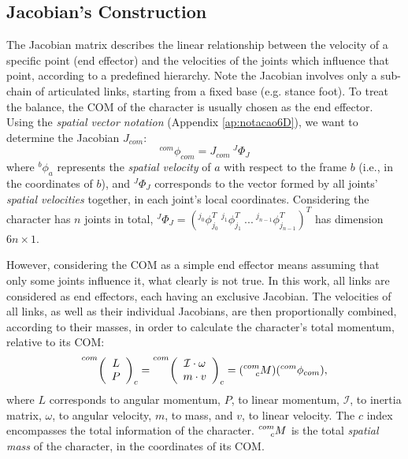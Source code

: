 \documentclass[tog]{acmsiggraph}
\begin{document}
\subsection{Jacobian's Construction}\label{subsec:Jacobiana}

The Jacobian matrix describes the linear relationship between the velocity of a specific point (end effector) and the velocities of the
joints which influence that point, according to a predefined hierarchy. Note the Jacobian involves only a sub-chain of articulated links,
starting from a fixed base (e.g. stance foot). To treat the balance, the COM of the character is usually chosen as the end effector.
Using the \textit{spatial vector notation} (Appendix \ref{ap:notacao6D}), we want to determine the Jacobian $J_ {com}$:
%
\begin{equation}
 ^{com}\phi_{com} = J_{com} ~ ^{J}\Phi_{J}
\label{eq:jacob}
\end{equation}
%
where $^b\phi_a$ represents the \textit{spatial velocity} of $a$ with respect to the frame $b$ (i.e., in the coordinates of $b$), and $^{J}\Phi_{J}$ corresponds to the vector formed by all joints' \textit{spatial velocities} together, in each joint's local coordinates.
Considering the character has $n$ joints in total,
$^{J}\Phi_{J} = \left( ^{j_{0}}\phi_{j_{0}}^T ~ ^{j_{1}}\phi_{j_{1}}^T ~ ... ~ ^{j_{n-1}}\phi_{j_{n-1}}^T \right)^T$ has dimension $6n\times1$.

However, considering the COM as a simple end effector means assuming that only some joints influence it, what clearly is not true.
In this work, all links are considered as end effectors, each having an exclusive Jacobian.
The velocities of all links, as well as their individual Jacobians, are then proportionally combined, according to their masses,
in order to calculate the character's total momentum, relative to its COM:
%
\begin{equation}
 \prescript{com}{}{ \left(\begin{array}{c} L \\ P \end{array}\right)_{c}} = \prescript{com}{}{ \left(\begin{array}{c} \mathcal{I} \cdot \omega \\ m \cdot v \end{array}\right)_{c}}
                                                                          = (\prescript{com}{c}{M}) (^{com}\phi _{com}),
\label{eq:MomTotal}
\end{equation}
%
where $L$ corresponds to angular momentum, $P$, to linear momentum, $\mathcal{I}$, to inertia matrix,
$\omega$, to angular velocity, $m$, to mass, and $v$, to linear velocity.
The $c$ index encompasses the total information of the character. $\prescript{com}{c}{M}$
is the total \textit{spatial mass} of the character, in the coordinates of its COM.
\end{document}
